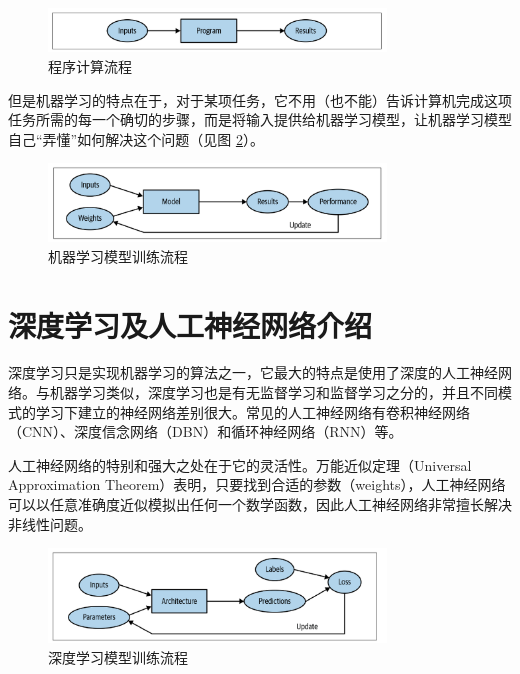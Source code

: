 \documentclass[AutoFakeBold]{LZUThesis}
\begin{document}
\begin{figure}[H]
    \centering
    \includegraphics[width=0.8\textwidth]{figures/input_output.png}
    \caption{程序计算流程}
    \label{fig_input_output}
\end{figure}

但是机器学习的特点在于，对于某项任务，它不用（也不能）告诉计算机完成这项任务所需的每一个确切的步骤，而是将输入提供给机器学习模型，让机器学习模型自己“弄懂”如何解决这个问题（见图 \ref{fig_machine-learning}）。

\begin{figure}[H]
    \centering
    \includegraphics[width=0.8\textwidth]{figures/machine-learning.png}
    \caption{机器学习模型训练流程}
    \label{fig_machine-learning}
\end{figure}






\section{深度学习及人工神经网络介绍}
深度学习只是实现机器学习的算法之一，它最大的特点是使用了深度的人工神经网络。与机器学习类似，深度学习也是有无监督学习和监督学习之分的，并且不同模式的学习下建立的神经网络差别很大。常见的人工神经网络有卷积神经网络（CNN）、深度信念网络（DBN）和循环神经网络（RNN）等。

人工神经网络的特别和强大之处在于它的灵活性。万能近似定理（Universal Approximation Theorem）表明，只要找到合适的参数（weights），人工神经网络可以以任意准确度近似模拟出任何一个数学函数，因此人工神经网络非常擅长解决非线性问题。

\begin{figure}[H]
    \centering
    \includegraphics[width=0.8\textwidth]{figures/deep-learning.png}
    \caption{深度学习模型训练流程}
    \label{fig_deep-learning}
\end{figure}
\end{document}
